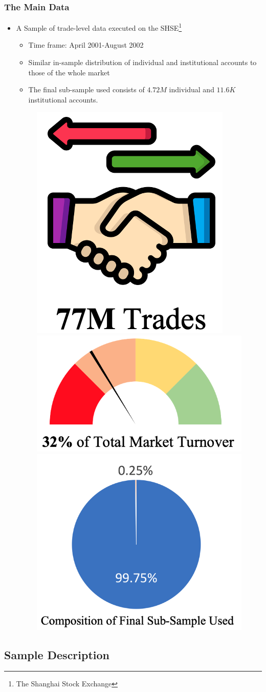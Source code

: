 \documentclass{beamer}
\begin{document}
\begin{frame}
    \frametitle{The Main Data}
    \begin{itemize}
        \item A Sample of trade-level data executed on the SHSE\footnote{The Shanghai Stock Exchange}
              \begin{itemize}
                  \item Time frame: April 2001-August 2002
                  \item Similar in-sample distribution of individual and institutional accounts to those of the whole market
                  \item The final sub-sample used consists of \(4.72M\) individual and \(11.6K\) institutional accounts.
              \end{itemize}
              \begin{figure}[b]
                  \includegraphics[width= .15\textwidth]{trade1.png}
                  \hspace{2em}
                  \includegraphics[width= .3\textwidth]{turnover.png}
                  \hspace{2em}
                  \includegraphics[width= .3\textwidth]{composition.png}
              \end{figure}
    \end{itemize}
\end{frame}


\subsection*{Sample Description}
\end{document}
